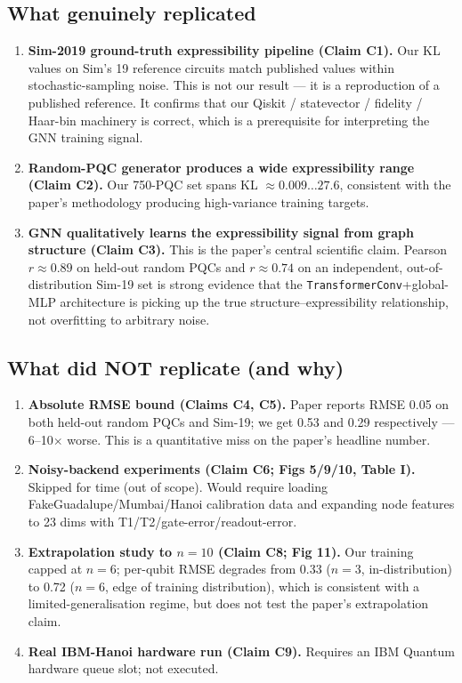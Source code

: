 \documentclass[11pt]{article}
\begin{document}
\subsection{What genuinely replicated}
\begin{enumerate}
  \item \textbf{Sim-2019 ground-truth expressibility pipeline (Claim C1).}
    Our KL values on Sim's 19 reference circuits match published values
    within stochastic-sampling noise. This is not our result --- it is a
    reproduction of a published reference. It confirms that our
    Qiskit / statevector / fidelity / Haar-bin machinery is correct,
    which is a prerequisite for interpreting the GNN training signal.
  \item \textbf{Random-PQC generator produces a wide expressibility range
    (Claim C2).} Our 750-PQC set spans KL \(\approx\!0.009 \ldots 27.6\),
    consistent with the paper's methodology producing high-variance
    training targets.
  \item \textbf{GNN qualitatively learns the expressibility signal from
    graph structure (Claim C3).} This is the paper's central scientific
    claim. Pearson \(r\!\approx\!0.89\) on held-out random PQCs and
    \(r\!\approx\!0.74\) on an independent, out-of-distribution Sim-19
    set is strong evidence that the \texttt{TransformerConv}+global-MLP
    architecture is picking up the true structure--expressibility
    relationship, not overfitting to arbitrary noise.
\end{enumerate}

\subsection{What did NOT replicate (and why)}
\begin{enumerate}
  \item \textbf{Absolute RMSE bound (Claims C4, C5).} Paper reports
    RMSE 0.05 on both held-out random PQCs and Sim-19; we get 0.53 and
    0.29 respectively --- 6--10\(\times\) worse. This is a quantitative
    miss on the paper's headline number.
  \item \textbf{Noisy-backend experiments (Claim C6; Figs 5/9/10, Table I).}
    Skipped for time (out of scope). Would require loading
    FakeGuadalupe/Mumbai/Hanoi calibration data and expanding node
    features to 23 dims with T1/T2/gate-error/readout-error.
  \item \textbf{Extrapolation study to \(n\!=\!10\) (Claim C8; Fig 11).}
    Our training capped at \(n\!=\!6\); per-qubit RMSE degrades from
    0.33 (\(n\!=\!3\), in-distribution) to 0.72 (\(n\!=\!6\), edge of
    training distribution), which is consistent with a
    limited-generalisation regime, but does not test the paper's
    extrapolation claim.
  \item \textbf{Real IBM-Hanoi hardware run (Claim C9).} Requires an IBM
    Quantum hardware queue slot; not executed.
\end{enumerate}
\end{document}
